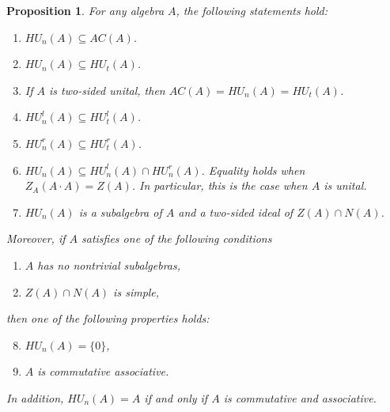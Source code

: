 \documentclass[12pt]{article}
\newtheorem{proposition}[theorem]{Proposition}
\begin{document}
		\begin{proposition}\label{prop:NU_subsets}
			For any algebra $A$, the following statements hold:
			\begin{enumerate}[label=\textnormal{\arabic*)},ref=\textnormal{\arabic*}]
				\item $HU_n(A)\subseteq AC(A)$.
				\item\label{item:subsets_2} $HU_n(A)\subseteq HU_t(A)$.
				\item\label{item:subsets_3} If $A$ is two-sided unital, then $AC(A)=HU_n(A)=HU_t(A)$.
				\item $HU_n^l(A)\subseteq HU_t^l(A)$.
				\item $HU_n^r(A)\subseteq HU_t^r(A)$.
				\item $HU_n(A)\subseteq HU_n^l(A)\cap HU_n^r(A)$. Equality holds when $Z_A(A\cdot A)=Z(A)$. In particular, this is the case when $A$ is unital.
				\item $HU_n(A)$ is a subalgebra of $A$ and a two-sided ideal of $Z(A)\cap N(A)$.
			\end{enumerate}
			Moreover, if $A$ satisfies one of the following conditions
			\begin{enumerate}[label=\textnormal{\roman*.}]
				\item $A$ has no nontrivial subalgebras,
				\item $Z(A)\cap N(A)$ is simple,
			\end{enumerate}
			then one of the following properties holds:
			\begin{enumerate}[label=\textnormal{\arabic*)}]
				\setcounter{enumi}{7}
				\item $HU_n(A)=\{0\}$,
				\item $A$ is commutative associative.
			\end{enumerate}
			In addition, $HU_n(A)=A$ if and only if $A$ is commutative and associative.
		\end{proposition}
		
\end{document}
